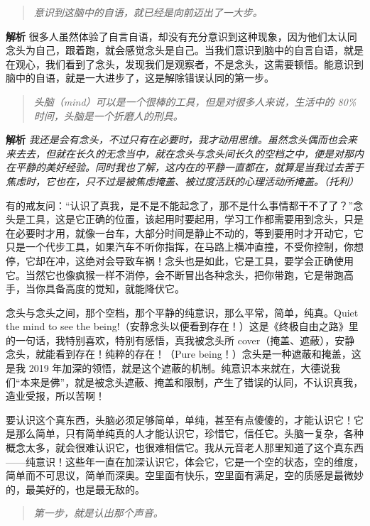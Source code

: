 \begin{quote}\it
    意识到这脑中的自语，就已经是向前迈出了一大步。
\end{quote}

\textbf{解析} 很多人虽然体验了自言自语，却没有充分意识到这种现象，因为他们太认同念头为自己，跟着跑，就会感觉念头是自己。当我们意识到脑中的自言自语，就是在观心，我们看到了念头，发现我们是观察者，不是念头，这需要顿悟。能意识到脑中的自语，就是一大进步了，这是解除错误认同的第一步。

\begin{quote}\it
    头脑（mind）可以是一个很棒的工具，但是对很多人来说，生活中的 80\% 时间，头脑是一个折磨人的刑具。
\end{quote}

\textbf{解析} \textit{我还是会有念头，不过只有在必要时，我才动用思维。虽然念头偶而也会来来去去，但就在长久的无念当中，就在念头与念头间长久的空档之中，便是对那内在平静的美好经验。同时我也了解，这内在的平静一直都在，就算是当我过去苦于焦虑时，它也在，只不过是被焦虑掩盖、被过度活跃的心理活动所掩盖。（托利）}

有的戒友问：“认识了真我，是不是不能起念了，那不是什么事情都干不了了？”念头是工具，这是它正确的位置，该起用时要起用，学习工作都需要用到念头，只是在必要时才用，就像一台车，大部分时间是静止不动的，等到要用时才开动它，它只是一个代步工具，如果汽车不听你指挥，在马路上横冲直撞，不受你控制，你想停，它却在冲，这绝对会导致车祸！念头也是如此，它是工具，要学会正确使用它。当然它也像疯猴一样不消停，会不断冒出各种念头，把你带跑，它是带跑高手，当你具备高度的觉知，就能降伏它。

念头与念头之间，那个空档，那个平静的纯意识，那么平常，简单，纯真。Quiet the mind to see the being!（安静念头以便看到存在！）这是《终极自由之路》里的一句话，我特别喜欢，特别有感悟，真我被念头所 cover（掩盖、遮蔽），安静念头，就能看到存在！纯粹的存在！（Pure being！）念头是一种遮蔽和掩盖，这是我 2019 年加深的领悟，就是这个遮蔽的机制。纯意识本来就在，大德说我们“本来是佛”，就是被念头遮蔽、掩盖和限制，产生了错误的认同，不认识真我，造业受报，所以苦啊！

要认识这个真东西，头脑必须足够简单，单纯，甚至有点傻傻的，才能认识它！它是那么简单，只有简单纯真的人才能认识它，珍惜它，信任它。头脑一复杂，各种概念太多，就会很难认识它，也很难相信它。我从元音老人那里知道了这个真东西——纯意识！这些年一直在加深认识它，体会它，它是一个空的状态，空的维度，简单而不可思议，简单而深奥。空里面有快乐，空里面有满足，空的质感是最微妙的，最美好的，也是最无敌的。

\begin{quote}\it
    第一步，就是认出那个声音。
\end{quote}

